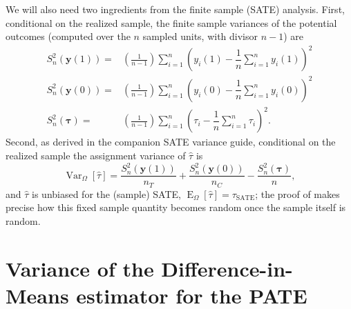 \documentclass[12pt,leqno]{article}
\theoremstyle{newstyle}
\DeclareMathOperator{\E}{\mathrm{E}}
\DeclareMathOperator{\Var}{\mathrm{Var}}
\newcommand{\bZ}{\bm{Z}}   \newcommand{\bz}{\bm{z}}   %
\newcommand{\EZ}{\E_{\Omega}}    \newcommand{\VarZ}{\Var_{\Omega}}  %
\newcommand{\po}[2]{y_{#1}(#2)}     %
\newcommand{\pov}[1]{\bm{y}(#1)}    %
\newcommand{\tauS}{\tau_{\text{SATE}}}
\newcommand{\tauhat}{\hat{\tau}}
\newcommand{\Ssq}[2][n]{S_{#1}^{2}(#2)}
\begin{document}
We will also need two ingredients from the finite sample (SATE) analysis. First, conditional on the realized sample, the finite sample variances of the potential outcomes (computed over the $n$ sampled units, with divisor $n - 1$) are
\begin{align}
\Ssq{\pov{1}} = & \left(\frac{1}{n - 1}\right)\sum \limits_{i = 1}^n \left(\po{i}{1} - \dfrac{1}{n} \sum \limits_{i = 1}^n \po{i}{1}\right)^2 \label{eq: fin sample var treated} \\
\Ssq{\pov{0}} = & \left(\frac{1}{n - 1}\right)\sum \limits_{i = 1}^n \left(\po{i}{0} - \dfrac{1}{n} \sum \limits_{i = 1}^n \po{i}{0}\right)^2 \label{eq: fin sample var control} \\
\Ssq{\bm{\tau}} = & \left(\frac{1}{n - 1}\right)\sum \limits_{i = 1}^n \left(\tau_{i} - \dfrac{1}{n} \sum \limits_{i = 1}^n \tau_i\right)^2. \label{eq: fin sample effects}
\end{align}
Second, as derived in the companion SATE variance guide, conditional on the realized sample the assignment variance of $\tauhat$ is
\begin{equation}
\label{eq: sate var recap}
\VarZ\left[\tauhat\right] = \dfrac{\Ssq{\pov{1}}}{n_T} + \dfrac{\Ssq{\pov{0}}}{n_C} - \dfrac{\Ssq{\bm{\tau}}}{n},
\end{equation}
and $\tauhat$ is unbiased for the (sample) SATE, $\EZ[\tauhat] = \tauS$; the proof of  makes precise how this fixed sample quantity becomes random once the sample itself is random.

\section{Variance of the Difference-in-Means estimator for the PATE}
\end{document}
